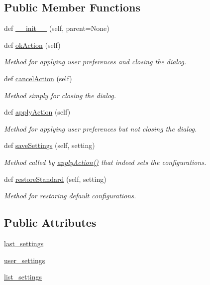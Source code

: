 \subsection*{Public Member Functions}
\begin{DoxyCompactItemize}
\item 
def \hyperlink{a00102_af773a0c74e666c299d2334a21966f8c9}{\+\_\+\+\_\+init\+\_\+\+\_\+} (self, parent=None)
\item 
def \hyperlink{a00102_a7e99113696fefa62dfdeb2ba1279350c}{ok\+Action} (self)
\begin{DoxyCompactList}\small\item\em Method for applying user preferences and closing the dialog. \end{DoxyCompactList}\item 
def \hyperlink{a00102_af92de31fcc110a9892dc2914efb6b46f}{cancel\+Action} (self)
\begin{DoxyCompactList}\small\item\em Method simply for closing the dialog. \end{DoxyCompactList}\item 
def \hyperlink{a00102_a8938a7b43ca7c5496a0ae7bf8d6a0c54}{apply\+Action} (self)
\begin{DoxyCompactList}\small\item\em Method for applying user preferences but not closing the dialog. \end{DoxyCompactList}\item 
def \hyperlink{a00102_a9cfbfd7abab4ba14d80c573a0534040b}{save\+Settings} (self, setting)
\begin{DoxyCompactList}\small\item\em Method called by \hyperlink{a00102_a8938a7b43ca7c5496a0ae7bf8d6a0c54}{apply\+Action()} that indeed sets the configurations. \end{DoxyCompactList}\item 
def \hyperlink{a00102_ab74be9049535f502252efb2df560ac8e}{restore\+Standard} (self, setting)
\begin{DoxyCompactList}\small\item\em Method for restoring default configurations. \end{DoxyCompactList}\end{DoxyCompactItemize}
\subsection*{Public Attributes}
\begin{DoxyCompactItemize}
\item 
\hyperlink{a00102_a8904394496c57e265ab1cf0346b025d9}{last\+\_\+settings}
\item 
\hyperlink{a00102_a0a02958126e9787f79af1a0f45fab30c}{user\+\_\+settings}
\item 
\hyperlink{a00102_aec84d483efd9155fc73699fe365ac9c2}{list\+\_\+settings}
\end{DoxyCompactItemize}


